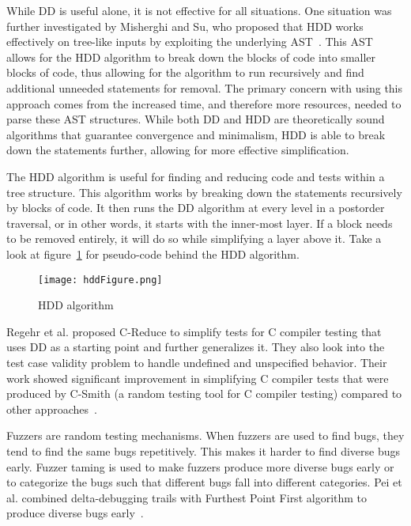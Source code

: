 While DD is useful alone, it is not effective for all situations. One situation was further investigated by Misherghi and Su, who proposed that HDD works effectively on tree-like inputs by exploiting the underlying AST~\cite{misherghi2006hdd}. This AST allows for the HDD algorithm to break down the blocks of code into smaller blocks of code, thus allowing for the algorithm to run recursively and find additional unneeded statements for removal. The primary concern with using this approach comes from the increased time, and therefore more resources, needed to parse these AST structures. While both DD and HDD are theoretically sound algorithms that guarantee convergence and minimalism, HDD is able to break down the statements further, allowing for more effective simplification. 

The HDD algorithm is useful for finding and reducing code and tests within a tree structure. This algorithm works by breaking down the statements recursively by blocks of code. It then runs the DD algorithm at every level in a postorder traversal, or in other words, it starts with the inner-most layer. If a block needs to be removed entirely, it will do so while simplifying a layer above it. Take a look at figure~\ref{fig:hddFigure} for pseudo-code behind the HDD algorithm.

\begin{center}
\begin{figure}[!ht]
\texttt{[image: hddFigure.png]}
\caption{HDD algorithm~\cite{misherghi2006hdd}}
\label{fig:hddFigure}
\end{figure}
\end{center}

Regehr et al. proposed C-Reduce to simplify tests for C compiler testing that uses DD as a starting point and further generalizes it. They also look into the test case validity problem to handle undefined and unspecified behavior. Their work showed significant improvement in simplifying C compiler tests that were produced by C-Smith (a random testing tool for C compiler testing) compared to other approaches~\cite{regehr2012test}.

Fuzzers are random testing mechanisms. When fuzzers are used to find bugs, they tend to find the same bugs repetitively. This makes it harder to find diverse bugs early. Fuzzer taming is used to make fuzzers produce more diverse bugs early or to categorize the bugs such that different bugs fall into different categories. Pei et al. combined delta-debugging trails with Furthest Point First algorithm to produce diverse bugs early~\cite{7022682}.


